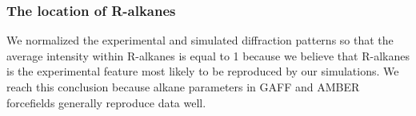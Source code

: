 \documentclass[journal=jpcbfk,manuscript=article]{achemso}
\begin{document}
%
  
  \subsubsection{The location of R-alkanes}\label{section:ralkanes}

  We normalized the experimental and simulated diffraction patterns so that the
  average intensity within R-alkanes is equal to 1 because we believe that
  R-alkanes is the experimental feature most likely to be reproduced by our
  simulations.  We reach this conclusion because alkane parameters in GAFF and
  AMBER forcefields generally reproduce data well.~\cite{original_gaff_paper} 
\end{document}
